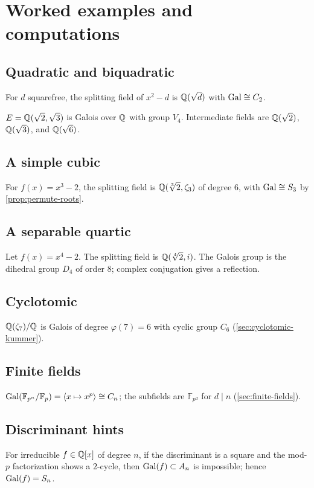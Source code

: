 \section{Worked examples and computations}\label{sec:worked-examples}

\subsection{Quadratic and biquadratic}
\begin{example}[Quadratic]
For $d$ squarefree, the splitting field of $x^2-d$ is $\mathbb{Q}(\sqrt d)$ with $\operatorname{Gal}\cong C_2$.
\end{example}
\begin{example}[Biquadratic]
$E=\mathbb{Q}(\sqrt2,\sqrt3)$ is Galois over $\mathbb{Q}$ with group $V_4$. Intermediate fields are $\mathbb{Q}(\sqrt2)$, $\mathbb{Q}(\sqrt3)$, and $\mathbb{Q}(\sqrt6)$.
\end{example}

\subsection{A simple cubic}
\begin{example}
For $f(x)=x^3-2$, the splitting field is $\Q(\root3\of2,\zeta_3)$ of degree $6$, with $\operatorname{Gal}\cong S_3$ by \cref{prop:permute-roots}.
\end{example}

\subsection{A separable quartic}
\begin{example}
Let $f(x)=x^4-2$. The splitting field is $\mathbb{Q}(\sqrt[4]{2},i)$. The Galois group is the dihedral group $D_4$ of order $8$; complex conjugation gives a reflection.
\end{example}

\subsection{Cyclotomic}
\begin{example}
$\mathbb{Q}(\zeta_7)/\mathbb{Q}$ is Galois of degree $\varphi(7)=6$ with cyclic group $C_6$ (\cref{sec:cyclotomic-kummer}).
\end{example}

\subsection{Finite fields}
\begin{example}
$\operatorname{Gal}(\mathbb{F}_{p^n}/\mathbb{F}_p)=\langle x\mapsto x^p\rangle\cong C_n$; the subfields are $\mathbb{F}_{p^d}$ for $d\mid n$ (\cref{sec:finite-fields}).
\end{example}

\subsection{Discriminant hints}
\begin{remark}
For irreducible $f\in\mathbb{Q}[x]$ of degree $n$, if the discriminant is a square and the mod-$p$ factorization shows a $2$-cycle, then $\operatorname{Gal}(f)\subset A_n$ is impossible; hence $\operatorname{Gal}(f)=S_n$.
\end{remark}

